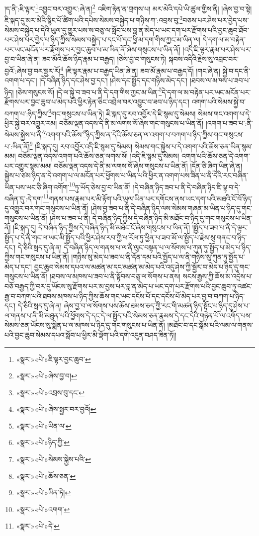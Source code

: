 །ད་ནི་:ཇི་ལྟར་\footnote{«སྣར་»«པེ་»ཇི་ལྟར་བྱང་ཆུབ་}འབྱུང་བར་འགྱུར་:ཞེ་ན།\footnote{«སྣར་»«པེ་»ཞེས་བྱ་བ།} འཇིག་རྟེན་ན་གྲགས་པ། མར་མེའི་དཔེ་ཡི་ཚུལ་གྱིས་ནི། །ཞེས་བྱ་བ་སྟེ། ཇི་སྐད་དུ་མར་མེའི་སྙིང་པོ་ཚིག་པའི་དཔེས་སེམས་བསྐྱེད་པ་གཉིས་ཀ་:འབྲས་བུ་\footnote{«སྣར་»«པེ་»འབྲས་བུ་དང་}བཅས་པར་ཤེས་པར་བྱེད་པས་སེམས་བསྐྱེད་པ་དེའི་ཡུལ་དུ་གྱུར་པས་ས་བཅུ་ལ་སློབ་པས་བླ་ན་མེད་པ་ཡང་དག་པར་རྫོགས་པའི་བྱང་ཆུབ་ཐོབ་པར་ཤེས་པར་བྱེད་པ་ཉིད་ཀྱིས་སེམས་བསྐྱེད་པ་དང་པོ་དང་ཕྱི་མ་དག་གིས་ཀྱང་མ་ཡིན་ལ། དེ་དག་ལ་མ་བརྟེན་པར་ཡང་མངོན་པར་རྫོགས་པར་བྱང་ཆུབ་པ་མ་ཡིན་ནོ་ཞེས་གསུངས་པ་ཡིན་ནོ། །འདི་ཇི་ལྟར་རྣམ་པར་ཤེས་པར་བྱ་བ་ཡིན་ཞེ་ན། ཟབ་མོའི་ཆོས་ཉིད་རྣམ་པ་བརྒྱད། །ཅེས་བྱ་བ་གསུངས་ཏེ། སྐབས་འདིའི་རྗེས་སུ་འབྲང་བར་བྱའོ་:ཞེས་བྱ་བར་སྦྱར་རོ།\footnote{«སྣར་»«པེ་»ཞེས་སྦྱར་བར་བྱའོ།} །ཇི་ལྟར་རྣམ་པ་བརྒྱད་ཡིན་ཞེ་ན། ཟབ་མོ་རྣམ་པ་བརྒྱད་དོ། །གང་ཞེ་ན། སྐྱེ་བ་དང་ནི་འགག་པ་དང་། །དེ་བཞིན་ཉིད་དང་ཤེས་བྱ་དང་། །ཤེས་དང་སྤྱོད་དང་གཉིས་མེད་དང་། །ཐབས་ལ་མཁས་པ་ཟབ་པ་ཉིད། །ཅེས་གསུངས་སོ། །དེ་ལ་སྐྱེ་བ་ཟབ་པ་ནི་དེ་དག་གིས་ཀྱང་མ་ཡིན་\footnote{«སྣར་»«པེ་»ཡིན་ལ་}དེ་དག་ལ་མ་བརྟེན་པར་ཡང་མངོན་པར་རྫོགས་པར་བྱང་ཆུབ་པ་མེད་པའི་ཕྱིར་རྟེན་ཅིང་འབྲེལ་བར་འབྱུང་བ་ཟབ་པ་ཉིད་དང་། འགག་པའི་སེམས་སྐྱེ་བ་བཀག་པ་:ཉིད་ཀྱིས་\footnote{«སྣར་»«པེ་»ཉིད་ཀྱི་}གང་གསུངས་པ་ཡིན་ཏེ། ཇི་སྐད་དུ་རབ་འབྱོར་དེ་ཇི་སྙམ་དུ་སེམས། སེམས་གང་འགག་པ་དེ་ཕྱིར་སྐྱེ་བར་འགྱུར་རམ། བཅོམ་ལྡན་འདས་དེ་ནི་མ་ལགས་སོ་ཞེས་གང་གསུངས་པ་ཡིན་ནོ། །འགག་པ་ཟབ་པ་:ནི་སེམས་སྐྱེས་པ་ནི་\footnote{«སྣར་»«པེ་»སེམས་སྐྱེས་པའི་}འགག་པའི་ཆོས་\footnote{«སྣར་»«པེ་»ཆོས་ཅན་}ཉིད་ཀྱིས་ན་དེའི་ཆོས་ཅན་ལ་འགག་པ་བཀག་པ་ཉིད་ཀྱིས་གང་གསུངས་པ་:ཡིན་ནོ།\footnote{«སྣར་»«པེ་»ཡིན་ཏེ།} །ཇི་སྐད་དུ། རབ་འབྱོར་འདི་ཇི་སྙམ་དུ་སེམས། སེམས་གང་སྐྱེས་པ་དེ་འགག་པའི་ཆོས་ཅན་ཡིན་སྙམ་མམ། བཅོམ་ལྡན་འདས་འགག་པའི་ཆོས་ཅན་ལགས་སོ། །འདི་ཇི་སྙམ་དུ་སེམས། འགག་པའི་ཆོས་ཅན་དེ་འགག་པར་འགྱུར་སྙམ་མམ། བཅོམ་ལྡན་འདས་དེ་ནི་མ་ལགས་སོ་ཞེས་གསུངས་པ་ཡིན་ནོ། །དོན་ཅི་ཞིག་ཡིན་ཞེ་ན། སྐྱེས་པ་ཙམ་ཉིད་ན་དེ་འགག་པ་ལ་མངོན་པར་ཕྱོགས་པ་ཡིན་པའི་ཕྱིར་ན་འགག་པས་ཟིན་པ་ནི་དེའི་རང་བཞིན་ཡིན་པས་ཡང་ཅི་ཞིག་འགོག་\footnote{«སྣར་»«པེ་»འགག་}ཏུ་ཡོད་ཅེས་བྱ་བ་ཡིན་ནོ། །དེ་བཞིན་ཉིད་ཟབ་པ་ནི་དེ་བཞིན་ཉིད་ཇི་ལྟ་བ་དེ་བཞིན་དུ་:དེ་དག་\footnote{«སྣར་»«པེ་»དེ་}གནས་པས་རྣམ་པར་མི་རྟོག་པའི་ཡུལ་ཡིན་པར་དགོངས་ནས་ཡང་དག་པའི་མཐའི་ངོ་བོ་ཉིད་དུ་འགྱུར་བར་གང་གསུངས་པ་ཡིན་ནོ། །ཤེས་བྱ་ཟབ་པ་ནི་དེ་བཞིན་ཉིད་ལས་སེམས་གཞན་མ་ཡིན་པ་ཉིད་དུ་གང་གསུངས་པ་ཡིན་ནོ། །ཤེས་པ་ཟབ་པ་ནི། དེ་བཞིན་ཉིད་ཀྱིས་དེ་བཞིན་ཉིད་མི་མཐོང་བ་ཉིད་དུ་གང་གསུངས་པ་ཡིན་ནོ། །ཇི་སྐད་དུ། དེ་བཞིན་ཉིད་ཀྱིས་དེ་བཞིན་ཉིད་མི་མཐོང་ངོ་ཞེས་གསུངས་པ་ཡིན་ནོ། །སྤྱོད་པ་ཟབ་པ་ནི་དེ་ལྟར་སྤྱོད་པ་དེ་ནི་གང་ལ་ཡང་མི་སྤྱོད་པའི་ཕྱིར་ཤེས་རབ་ཀྱི་ཕ་རོལ་ཏུ་ཕྱིན་པ་ཟབ་མོ་ལ་སྤྱོད་པ་རྗེས་སུ་གནང་བ་ཉིད་དང་། དེ་ཅིའི་སླད་དུ་ཞེ་ན། དེ་བཞིན་ཉིད་ལ་གནས་པ་ལ་ནི་ལུང་བསྟན་པ་ལ་སོགས་པ་ཀུན་ཏུ་སྤྱོད་པ་མེད་པ་ཉིད་ཀྱིས་གང་གསུངས་པ་ཡིན་ནོ། །གཉིས་སུ་མེད་པ་ཟབ་པ་ནི་དོན་དམ་པའི་སྤྱོད་པ་ལ་ནི་གཉིས་སུ་ཀུན་ཏུ་སྤྱོད་པ་མེད་པ་དང་། བྱང་ཆུབ་སེམས་དཔའ་ལ་མཚན་མ་དང་མཚན་མ་མེད་པའི་འདུ་ཤེས་ཀྱི་སྦྱོར་བ་མེད་པ་ཉིད་དུ་གང་གསུངས་པ་ཡིན་ནོ། །ཐབས་ལ་མཁས་པ་ཟབ་པ་ནི་སྟོབས་བཅུ་ལ་སོགས་པ་ནས། སངས་རྒྱས་ཀྱི་ཆོས་མ་འདྲེས་པ་བཅོ་བརྒྱད་ཀྱི་བར་དུ་ཡོངས་སུ་རྫོགས་པར་མ་བྱས་པར་བླ་ན་མེད་པ་ཡང་དག་པར་རྫོགས་པའི་བྱང་ཆུབ་ཏུ་འཚང་རྒྱ་བ་བཀག་པའི་ཐབས་མཁས་པ་ཉིད་ཀྱིས་ཆོས་གང་ཡང་དངོས་པོ་དང་དངོས་པོ་མེད་པར་བྱ་བ་བཀག་པ་ཉིད་དང་། དེ་ཅིའི་སླད་དུ་ཞེ་ན། ཞེས་བྱ་བ་ལ་སོགས་པས་ཆོས་ཐམས་ཅད་ཀྱི་རང་གི་མཚན་ཉིད་སྟོང་པ་ཉིད་དུ་ཤེས་པ་ལ་གནས་པ་ནི་མི་མཐུན་པའི་ཕྱོགས་དེ་དང་དེ་ལ་སྤྱོད་པའི་སེམས་ཅན་རྣམས་དེ་དང་དེའི་གཉེན་པོ་ལ་འགོད་པས་སེམས་ཅན་ཡོངས་སུ་སྨིན་པ་ལ་མཁས་པ་ཉིད་དུ་གང་གསུངས་པ་ཡིན་ནོ། །མཐོང་བ་དང་སྒོམ་པའི་ལམ་ལ་གནས་པའི་བྱང་ཆུབ་སེམས་དཔའ་སློབ་པ་ཕྱིར་མི་ལྡོག་པའི་དགེ་འདུན་བཤད་ཟིན་ཏོ།། 